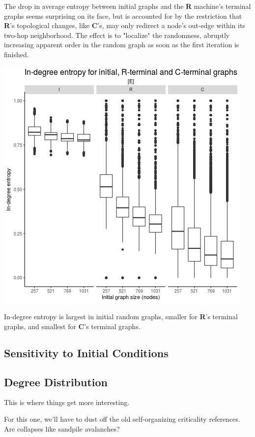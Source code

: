 \documentclass{tufte-handout}
\begin{document}
{The drop in average entropy between initial graphs and the \textbf{R} machine's terminal
graphs seems surprising on its face, but is accounted for by the restriction that
\textbf{R}'s topological changes, like \textbf{C}'s, may only redirect a node's out-edge
within its two-hop neighborhood.
The effect is to "localize" the randomness, abruptly increasing apparent order in the
random graph as soon as the first iteration is finished.

\begin{marginfigure}
  \includegraphics{figE.png}
  \caption{In-degree entropy is largest in initial random graphs,
        smaller for \textbf{R}'s terminal graphs, and smallest for \textbf{C}'s terminal graphs.}
  \label{fig:figE}
\end{marginfigure}

\subsection{Sensitivity to Initial Conditions}

\subsection{Degree Distribution}

This is where things get more interesting.

For this one, we'll have to dust off the old self-organizing criticality
references. Are collapses like sandpile avalanches?

}
\end{document}

